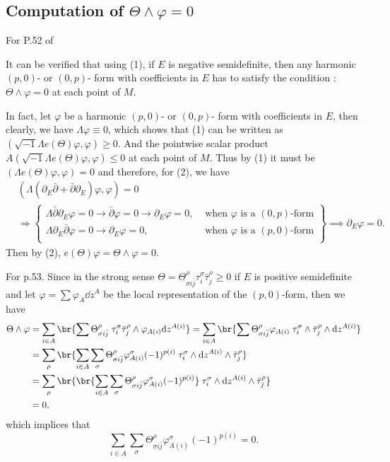 \documentclass[lang=en,12pt]{beautybook}
\begin{document}
\subsection{Computation of \texorpdfstring{$\Theta\wedge\varphi=0$}{}}
For P.52 of \cite{gigante1981vector}
\begin{fancybox}
  It can be verified that using (1), if $E$ is negative semidefinite, then any harmonic $(p,0)$- or $(0,p)$- form with coefficients in $E$ has to satisfy the condition : $\Theta\wedge\varphi=0$ at each point of $M$.
\end{fancybox}
In fact, let $\varphi$ be a harmonic $(p,0)$- or $(0,p)$- form with coefficients in $E$, then clearly, we have $\Lambda\varphi\equiv 0$, which shows that (1) can be written as $(\sqrt{-1}\Lambda e(\Theta)\varphi,\varphi)\geqslant 0$. And the pointwise scalar product $A(\sqrt{-1}\Lambda e(\Theta)\varphi,\varphi)\leqslant 0$ at each point of $M$. Thus by (1) it must be $(\Lambda e(\Theta)\varphi,\varphi)=0$ and therefore, for (2), we have 
\begin{align*}
  &(\Lambda(\partial_E \bar{\partial}+\bar{\partial}\partial_E)\varphi,\varphi)=0\\
  &\Longrightarrow \left.\begin{cases}
    \Lambda\bar{\partial}\partial_E\varphi=0\rightarrow \bar{\partial}\varphi=0\rightarrow \partial_E\varphi=0, &\text{ when $\varphi$ is a $(0,p)$-form}\\ 
    \Lambda\partial_E \bar{\partial}\varphi=0\rightarrow \partial_E\varphi=0, &\text{ when $\varphi$ is a $(p,0)$-form}\\ 
  \end{cases}\right\}\implies \partial_E\varphi=0.
\end{align*}
Then by (2), $e(\Theta)\varphi=\Theta\wedge\varphi=0$.

For p.53. Since in the strong sense $\Theta=\Theta_{\sigma i\bar{j}}^\rho \tau^\sigma_i \bar{\tau}_j^\rho\geqslant 0$ if $E$ is positive semidefinite and let $\varphi=\sum \varphi_A \dd z^A$ be the local representation of the $(p,0)$-form, then we have
\begin{align*}
  \Theta\wedge\varphi &=\sum_{i\in A}\br{\sum \Theta_{\sigma i\bar{j}}^\rho \;\tau^\sigma_i \bar{\tau}_j^\rho\wedge\varphi_{A(i)}\dd z^{A(i)}}
  =\sum_{i\in A}\br{\sum \Theta_{\sigma i\bar{j}}^\rho \varphi_{A(i)} \;\tau^\sigma_i  \wedge\bar{\tau}_j^\rho\wedge\dd z^{A(i)}}\\ 
&=\sum_\rho \br{\sum_{i\in A}\sum_\sigma \Theta_{\sigma i\bar{j}}^\rho \varphi_{A(i)}^\sigma (-1)^{p(i)}\;\tau^\sigma_i \wedge\dd z^{A(i)} \wedge\bar{\tau}_j^\rho}\\ 
&=\sum_\rho \br{\br{\sum_{i\in A}\sum_\sigma \Theta_{\sigma i\bar{j}}^\rho \varphi_{A(i)}^\sigma (-1)^{p(i)}}\;\tau^\sigma_i \wedge\dd z^{A(i)} \wedge\bar{\tau}_j^\rho}\\ 
&=0,
\end{align*}
which implices that 
\[\sum_{i\in A}\sum_\sigma \Theta_{\sigma i\bar{j}}^\rho \varphi_{A(i)}^\sigma (-1)^{p(i)}=0.\]
\end{document}

